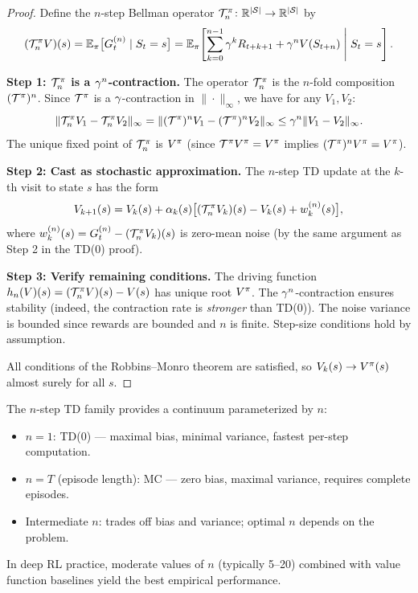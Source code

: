 \documentclass[11pt,a4paper]{article}
\begin{document}
\begin{proof}
Define the $n$-step Bellman operator
$\mathcal{T}_n^\pi \colon \mathbb{R}^{|\mathcal{S}|} \to \mathbb{R}^{|\mathcal{S}|}$ by
\begin{equation}
  (\mathcal{T}_n^\pi V)(s)
  = \mathbb{E}_\pi\bigl[G_t^{(n)} \mid S_t = s\bigr]
  = \mathbb{E}_\pi\!\left[\sum_{k=0}^{n-1} \gamma^k R_{t+k+1}
    + \gamma^n V(S_{t+n}) \;\middle|\; S_t = s\right].
  \label{eq:nstep_operator}
\end{equation}

\textbf{Step 1: $\mathcal{T}_n^\pi$ is a $\gamma^n$-contraction.}
The operator $\mathcal{T}_n^\pi$ is the $n$-fold composition
$(\mathcal{T}^\pi)^n$. Since $\mathcal{T}^\pi$ is a
$\gamma$-contraction in $\|\cdot\|_\infty$, we have for any
$V_1, V_2$:
\begin{equation}
  \|\mathcal{T}_n^\pi V_1 - \mathcal{T}_n^\pi V_2\|_\infty
  = \|(\mathcal{T}^\pi)^n V_1 - (\mathcal{T}^\pi)^n V_2\|_\infty
  \leq \gamma^n \|V_1 - V_2\|_\infty.
\end{equation}
The unique fixed point of $\mathcal{T}_n^\pi$ is $V^{\pi}$
(since $\mathcal{T}^\pi V^{\pi} = V^{\pi}$ implies
$(\mathcal{T}^\pi)^n V^{\pi} = V^{\pi}$).

\textbf{Step 2: Cast as stochastic approximation.}
The $n$-step TD update at the $k$-th visit to state $s$ has the form
\begin{equation}
  V_{k+1}(s) = V_k(s)
  + \alpha_k(s)\bigl[(\mathcal{T}_n^\pi V_k)(s) - V_k(s)
    + w_k^{(n)}(s)\bigr],
\end{equation}
where $w_k^{(n)}(s) = G_t^{(n)} - (\mathcal{T}_n^\pi V_k)(s)$ is
zero-mean noise (by the same argument as Step 2 in the TD(0) proof).

\textbf{Step 3: Verify remaining conditions.}
The driving function $h_n(V)(s) = (\mathcal{T}_n^\pi V)(s) - V(s)$
has unique root $V^{\pi}$. The $\gamma^n$-contraction ensures stability
(indeed, the contraction rate is \emph{stronger} than TD(0)). The
noise variance is bounded since rewards are bounded and $n$ is finite.
Step-size conditions hold by assumption.

All conditions of the Robbins--Monro theorem are satisfied, so
$V_k(s) \to V^{\pi}(s)$ almost surely for all $s$.
\end{proof}

\begin{rlconnection}[title={The Spectrum from TD(0) to MC}]
The $n$-step TD family provides a continuum parameterized by $n$:
\begin{itemize}[nosep]
  \item $n = 1$: TD(0) --- maximal bias, minimal variance, fastest
    per-step computation.
  \item $n = T$ (episode length): MC --- zero bias, maximal variance,
    requires complete episodes.
  \item Intermediate $n$: trades off bias and variance; optimal $n$
    depends on the problem.
\end{itemize}
In deep RL practice, moderate values of $n$ (typically 5--20) combined
with value function baselines yield the best empirical performance.
\end{rlconnection}
\end{document}
